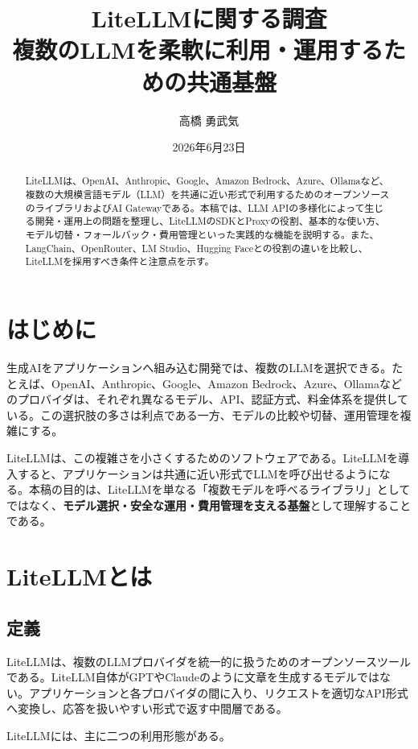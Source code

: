 \documentclass[a4paper,11pt]{jsarticle}
\title{LiteLLMに関する調査\\
\large 複数のLLMを柔軟に利用・運用するための共通基盤}
\author{高橋 勇武気}
\date{2026年6月23日}
\begin{document}
\maketitle

\begin{abstract}
LiteLLMは、OpenAI、Anthropic、Google、Amazon Bedrock、Azure、Ollamaなど、複数の大規模言語モデル（LLM）を共通に近い形式で利用するためのオープンソースのライブラリおよびAI Gatewayである。本稿では、LLM APIの多様化によって生じる開発・運用上の問題を整理し、LiteLLMのSDKとProxyの役割、基本的な使い方、モデル切替・フォールバック・費用管理といった実践的な機能を説明する。また、LangChain、OpenRouter、LM Studio、Hugging Faceとの役割の違いを比較し、LiteLLMを採用すべき条件と注意点を示す。
\end{abstract}

\tableofcontents
\newpage

\section{はじめに}

生成AIをアプリケーションへ組み込む開発では、複数のLLMを選択できる。たとえば、OpenAI、Anthropic、Google、Amazon Bedrock、Azure、Ollamaなどのプロバイダは、それぞれ異なるモデル、API、認証方式、料金体系を提供している。この選択肢の多さは利点である一方、モデルの比較や切替、運用管理を複雑にする。

LiteLLMは、この複雑さを小さくするためのソフトウェアである。LiteLLMを導入すると、アプリケーションは共通に近い形式でLLMを呼び出せるようになる。本稿の目的は、LiteLLMを単なる「複数モデルを呼べるライブラリ」としてではなく、\textbf{モデル選択・安全な運用・費用管理を支える基盤}として理解することである。

\section{LiteLLMとは}

\subsection{定義}

LiteLLMは、複数のLLMプロバイダを統一的に扱うためのオープンソースツールである。LiteLLM自体がGPTやClaudeのように文章を生成するモデルではない。アプリケーションと各プロバイダの間に入り、リクエストを適切なAPI形式へ変換し、応答を扱いやすい形式で返す中間層である。

LiteLLMには、主に二つの利用形態がある。
\end{document}
